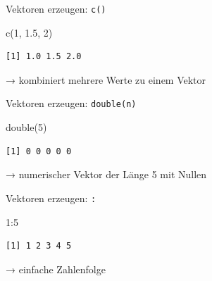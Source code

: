 \documentclass[
  10pt,
  ignorenonframetext,
  aspectratio=169,
]{beamer}
\newenvironment{Shaded}{}{}
\newcommand{\DecValTok}[1]{\textcolor[rgb]{0.25,0.63,0.44}{#1}}
\newcommand{\FloatTok}[1]{\textcolor[rgb]{0.25,0.63,0.44}{#1}}
\newcommand{\FunctionTok}[1]{\textcolor[rgb]{0.02,0.16,0.49}{#1}}
\newcommand{\NormalTok}[1]{#1}
\newcommand{\SpecialCharTok}[1]{\textcolor[rgb]{0.25,0.44,0.63}{#1}}
\begin{document}
\begin{frame}[fragile]{Vektoren erzeugen: \texttt{c()}}
\label{vektoren-erzeugen-c}
\begin{Shaded}
\begin{Highlighting}[]
\FunctionTok{c}\NormalTok{(}\DecValTok{1}\NormalTok{, }\FloatTok{1.5}\NormalTok{, }\DecValTok{2}\NormalTok{)}
\end{Highlighting}
\end{Shaded}

\begin{verbatim}
[1] 1.0 1.5 2.0
\end{verbatim}

→ kombiniert mehrere Werte zu einem Vektor
\end{frame}

\begin{frame}[fragile]{Vektoren erzeugen: \texttt{double(n)}}
\label{vektoren-erzeugen-doublen}
\begin{Shaded}
\begin{Highlighting}[]
\FunctionTok{double}\NormalTok{(}\DecValTok{5}\NormalTok{)}
\end{Highlighting}
\end{Shaded}

\begin{verbatim}
[1] 0 0 0 0 0
\end{verbatim}

→ numerischer Vektor der Länge 5 mit Nullen
\end{frame}

\begin{frame}[fragile]{Vektoren erzeugen: \texttt{:}}
\label{vektoren-erzeugen}
\begin{Shaded}
\begin{Highlighting}[]
\DecValTok{1}\SpecialCharTok{:}\DecValTok{5}
\end{Highlighting}
\end{Shaded}

\begin{verbatim}
[1] 1 2 3 4 5
\end{verbatim}

→ einfache Zahlenfolge
\end{frame}
\end{document}
